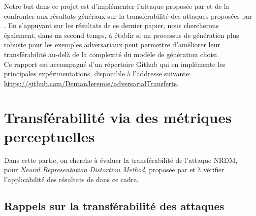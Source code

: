 \documentclass{article}
\begin{document}
\noindent Notre but dans ce projet est d'implémenter l'attaque proposée par \citet{Naseer2018TaskgeneralizableAA} et de la confronter aux résultats généraux sur la transférabilité des attaques proposées par \citet{Demontis2018WhyDA}. En s'appuyant sur les résultats de ce dernier papier, nous chercherons également, dans un second temps, à établir si un processus de génération plus robuste pour les exemples adversariaux peut permettre d'améliorer leur transférabilité au-delà de la complexité du modèle de génération choisi. \\

\noindent Ce rapport est accompagné d'un répertoire Github qui en implémente les principales expérimentations, disponible à l'addresse suivante: \url{https://github.com/DentanJeremie/adversarialTransferts}.

\section{Transférabilité via des métriques perceptuelles}
\label{chap:transferability_perceptual}

Dans cette partie, on cherche à évaluer la transférabilité de l'attaque NRDM, pour \textit{Neural Representation Distortion Method}, proposée par \citet{Naseer2018TaskgeneralizableAA} et à vérifier l'applicabilité des résultats de \citet{Demontis2018WhyDA} dans ce cadre.

\subsection{Rappels sur la transférabilité des attaques}
\end{document}
